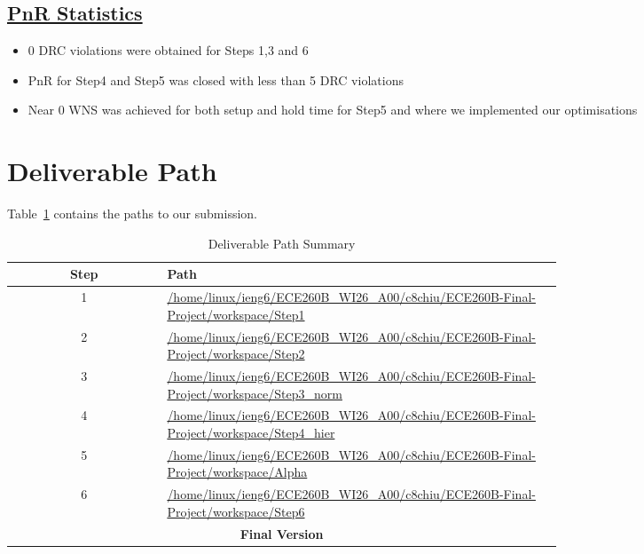 \documentclass[journal]{IEEEtran}
\begin{document}
\subsection{\underline{\textnormal{PnR Statistics}}}
\begin{itemize}
    \item 0 DRC  violations were obtained for Steps 1,3 and 6
    \item PnR for Step4 and Step5 was closed with less than 5 DRC violations
    \item Near 0 WNS was achieved  for both setup and hold time for  Step5 and  where we implemented our optimisations
\end{itemize}

\section{Deliverable Path}
Table~\ref{tab:deliverable} contains the paths to our submission.
\begin{table}[htbp]
    \caption{Deliverable Path Summary\label{tab:deliverable}}
    \centering
    \begin{tabular}{|c|>{\raggedright\arraybackslash}p{0.72\linewidth}|}
        \hline
        \textbf{Step} & \textbf{Path} \\
        \hline
        1 & \url{/home/linux/ieng6/ECE260B_WI26_A00/c8chiu/ECE260B-Final-Project/workspace/Step1} \\
        \hline
        2 & \url{/home/linux/ieng6/ECE260B_WI26_A00/c8chiu/ECE260B-Final-Project/workspace/Step2} \\
        \hline
        3 & \url{/home/linux/ieng6/ECE260B_WI26_A00/c8chiu/ECE260B-Final-Project/workspace/Step3_norm} \\
        \hline
        4 & \url{/home/linux/ieng6/ECE260B_WI26_A00/c8chiu/ECE260B-Final-Project/workspace/Step4_hier} \\
        \hline
        5 & \url{/home/linux/ieng6/ECE260B_WI26_A00/c8chiu/ECE260B-Final-Project/workspace/Alpha} \\
        \hline
        6 & \url{/home/linux/ieng6/ECE260B_WI26_A00/c8chiu/ECE260B-Final-Project/workspace/Step6} \\
        \hline
        \multicolumn{2}{|c|}{\textbf{Final Version}} \\
        \hline
    \end{tabular}
\end{table}
\end{document}
